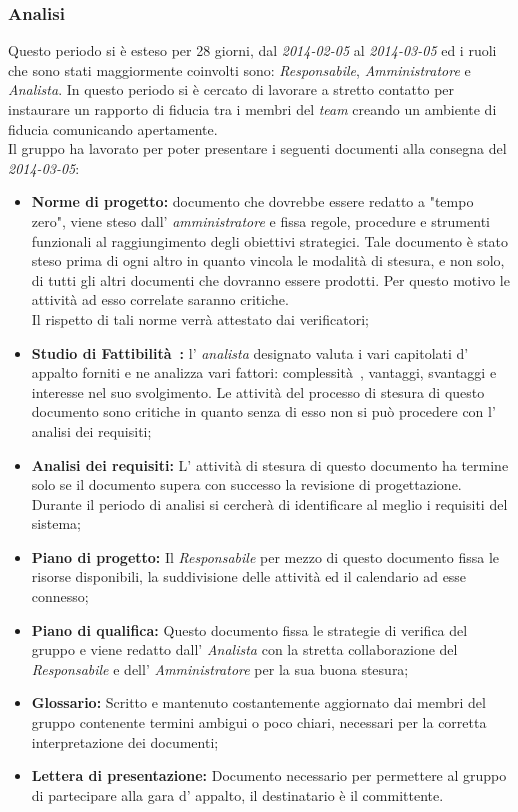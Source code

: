 \subsubsection{Analisi}
Questo periodo si è esteso per 28 giorni, dal \textit{2014-02-05} al \textit{2014-03-05} ed i ruoli che sono stati maggiormente coinvolti sono: \textit{Responsabile}, \textit{Amministratore} e \textit{Analista}.
In questo periodo si è cercato di lavorare a stretto contatto per instaurare un rapporto di fiducia tra i membri del \textit{team} creando un ambiente di fiducia comunicando apertamente.
\\
Il gruppo \gruppo ha lavorato per poter presentare i seguenti documenti alla consegna del \textit{2014-03-05}:
\begin{itemize}
	\item \textbf{Norme di progetto:} documento che dovrebbe essere redatto a "tempo zero", viene steso dall' \textit{amministratore} e fissa regole, procedure e strumenti funzionali al raggiungimento degli obiettivi strategici. Tale documento è stato steso prima di ogni altro in quanto vincola le modalità di stesura, e non solo, di tutti gli altri documenti che dovranno essere prodotti. Per questo motivo le attività ad esso correlate saranno critiche.
	\\ Il rispetto di tali norme verrà attestato dai verificatori;
	\item \textbf{Studio di Fattibilità~:} l' \textit{analista} designato valuta i vari capitolati d' appalto forniti e ne analizza vari fattori: complessità~, vantaggi, svantaggi e interesse nel suo svolgimento. Le attività del processo di stesura di questo documento sono critiche in quanto senza di esso non si può procedere con l' analisi dei requisiti;
	\item \textbf{Analisi dei requisiti:} L' attività di stesura di questo documento ha termine solo se il documento supera con successo la revisione di progettazione. Durante il periodo di analisi si cercherà di identificare al meglio i requisiti del sistema;
	\item \textbf{Piano di progetto:} Il \textit{Responsabile} per mezzo di questo documento fissa le risorse disponibili, la suddivisione delle attività ed il calendario ad esse connesso; 
	\item \textbf{Piano di qualifica:} Questo documento fissa le strategie di verifica del gruppo e viene redatto dall' \textit{Analista} con la stretta collaborazione del \textit{Responsabile} e dell' \textit{Amministratore} per la sua buona stesura;
	\item \textbf{Glossario:} Scritto e mantenuto costantemente aggiornato dai membri del gruppo contenente termini ambigui o poco chiari, necessari per la corretta interpretazione dei documenti;
	\item \textbf{Lettera di presentazione:} Documento necessario per permettere al gruppo di partecipare alla gara d' appalto, il destinatario è il committente.
\end{itemize}
